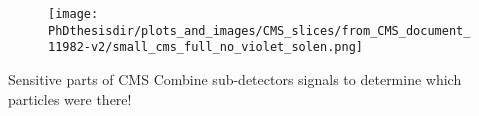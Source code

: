 \begin{frame}
\addtocounter{framenumber}{-1}
\begin{minipage}[t]{.6\textwidth}
\begin{figure}
\texttt{[image: \\PhDthesisdir/plots\_and\_images/CMS\_slices/from\_CMS\_document\_11982-v2/small\_cms\_full\_no\_violet\_solen.png]}
\end{figure}
\end{minipage}
\hfill\begin{minipage}[t]{.35\textwidth}
\begin{block}{Sensitive parts of CMS}
Combine sub-detectors signals to determine which particles were there!
\end{block}
\end{minipage}
\end{frame}